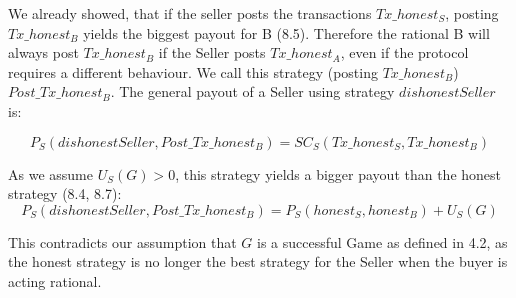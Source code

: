 \documentclass{cacthesis}
\begin{document}
We already showed, that if the seller posts the transactions $Tx\_honest_S$, posting $Tx\_honest_B$ yields the biggest payout for B (8.5).\newline
Therefore the rational B will always post $Tx\_honest_B$ if the Seller posts $Tx\_honest_A$, even if the protocol requires a different behaviour. We call this strategy (posting $Tx\_honest_B$) $Post\_Tx\_honest_B$.\newline
The general payout of a Seller using strategy $dishonestSeller$ is:

\begin{equation}
    P_S(dishonestSeller,Post\_Tx\_honest_B) = SC_S(Tx\_honest_S,Tx\_honest_B)
\end{equation}

As we assume $U_S(G) > 0$, this strategy yields a bigger payout than the honest strategy (8.4, 8.7):
\[P_S(dishonestSeller,Post\_Tx\_honest_B) = P_S(honest_S,honest_B) + U_S(G)\]

This contradicts our assumption that $G$ is a successful Game as defined in 4.2, as the honest strategy is no longer the best strategy for the Seller when the buyer is acting rational.
	
	
	\printbibliography
	
	\appendix
\end{document}
